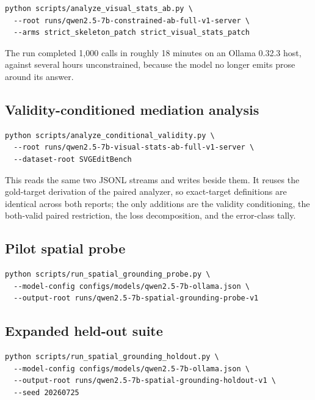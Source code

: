 \documentclass[10pt,a4paper]{article}
\begin{document}
\begin{lstlisting}[style=compact,language={}]
python scripts/analyze_visual_stats_ab.py \
  --root runs/qwen2.5-7b-constrained-ab-full-v1-server \
  --arms strict_skeleton_patch strict_visual_stats_patch
\end{lstlisting}

The run completed 1,000 calls in roughly 18 minutes on an Ollama 0.32.3 host,
against several hours unconstrained, because the model no longer emits prose
around its answer.

\subsection{Validity-conditioned mediation analysis}

\begin{lstlisting}[style=compact,language={}]
python scripts/analyze_conditional_validity.py \
  --root runs/qwen2.5-7b-visual-stats-ab-full-v1-server \
  --dataset-root SVGEditBench
\end{lstlisting}

This reads the same two JSONL streams and writes
 beside them. It reuses the gold-target
derivation of the paired analyzer, so exact-target definitions are identical
across both reports; the only additions are the validity conditioning, the
both-valid paired restriction, the loss decomposition, and the error-class
tally.

\subsection{Pilot spatial probe}

\begin{lstlisting}[style=compact,language={}]
python scripts/run_spatial_grounding_probe.py \
  --model-config configs/models/qwen2.5-7b-ollama.json \
  --output-root runs/qwen2.5-7b-spatial-grounding-probe-v1
\end{lstlisting}

\subsection{Expanded held-out suite}

\begin{lstlisting}[style=compact,language={}]
python scripts/run_spatial_grounding_holdout.py \
  --model-config configs/models/qwen2.5-7b-ollama.json \
  --output-root runs/qwen2.5-7b-spatial-grounding-holdout-v1 \
  --seed 20260725
\end{lstlisting}
\end{document}
